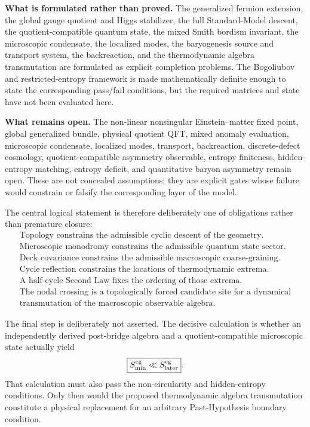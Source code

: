 \documentclass[11pt]{article}
\theoremstyle{canonmath}
\theoremstyle{canonpostulate}
\theoremstyle{canonclaim}
\begin{document}
\textbf{What is formulated rather than proved.} The generalized fermion extension, the global gauge quotient and Higgs stabilizer, the full Standard-Model descent, the quotient-compatible quantum state, the mixed Smith bordism invariant, the microscopic condensate, the localized modes, the baryogenesis source and transport system, the backreaction, and the thermodynamic algebra transmutation are formulated as explicit completion problems. The Bogoliubov and restricted-entropy framework is made mathematically definite enough to state the corresponding pass/fail conditions, but the required matrices and state have not been evaluated here.

\textbf{What remains open.} The non-linear nonsingular Einstein--matter fixed point, global generalized bundle, physical quotient QFT, mixed anomaly evaluation, microscopic condensate, localized modes, transport, backreaction, discrete-defect cosmology, quotient-compatible asymmetry observable, entropy finiteness, hidden-entropy matching, entropy deficit, and quantitative baryon asymmetry remain open. These are not concealed assumptions; they are explicit gates whose failure would constrain or falsify the corresponding layer of the model.

The central logical statement is therefore deliberately one of obligations rather than premature closure:
\begin{equation*}
\boxed{\begin{gathered}
\text{Topology constrains the admissible cyclic descent of the geometry.}\\
\text{Microscopic monodromy constrains the admissible quantum state sector.}\\
\text{Deck covariance constrains the admissible macroscopic coarse-graining.}\\
\text{Cycle reflection constrains the locations of thermodynamic extrema.}\\
\text{A half-cycle Second Law fixes the ordering of those extrema.}\\
\text{The nodal crossing is a topologically forced candidate site for a dynamical}\\
\text{transmutation of the macroscopic observable algebra.}
\end{gathered}}
\end{equation*}

The final step is deliberately not asserted. The decisive calculation is whether an independently derived post-bridge algebra and a quotient-compatible microscopic state actually yield
\begin{equation}
\boxed{S_{\min}^{\rm cg}\ll S_{\rm later}^{\rm cg}}.
\end{equation}
That calculation must also pass the non-circularity and hidden-entropy conditions. Only then would the proposed thermodynamic algebra transmutation constitute a physical replacement for an arbitrary Past-Hypothesis boundary condition.
\end{document}
